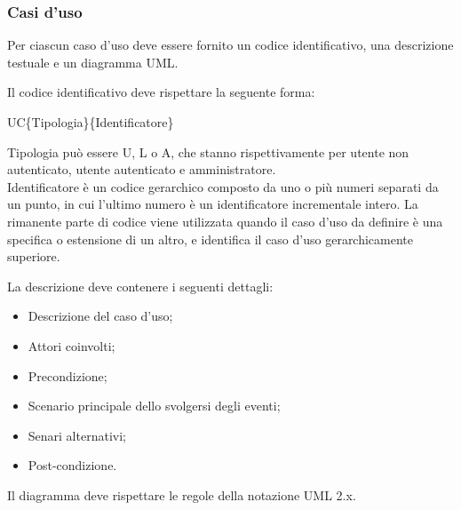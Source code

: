 \subsubsection{Casi d'uso}
Per ciascun caso d'uso deve essere fornito un codice identificativo, una descrizione testuale e un diagramma UML.

\begin{flushleft}
Il codice identificativo deve rispettare la seguente forma:
\end{flushleft}

\begin{center}UC\{Tipologia\}\{Identificatore\}\end{center}
Tipologia può essere U, L o A, che stanno rispettivamente per utente non autenticato, utente autenticato e amministratore.\\
Identificatore è un codice gerarchico composto da uno o più numeri separati da un punto, in cui l'ultimo numero è un identificatore incrementale intero.
La rimanente parte di codice viene utilizzata quando il caso d'uso da definire è una specifica o estensione di un altro, e identifica il caso d'uso gerarchicamente superiore.

\begin{flushleft}
La descrizione deve contenere i seguenti dettagli:
\end{flushleft}

\begin{itemize}
\item Descrizione del caso d'uso;
\item Attori coinvolti;
\item Precondizione;
\item Scenario principale dello svolgersi degli eventi;
\item Senari alternativi;
\item Post-condizione.
\end{itemize}

\begin{flushleft}
Il diagramma deve rispettare le regole della notazione UML 2.x.
\end{flushleft}